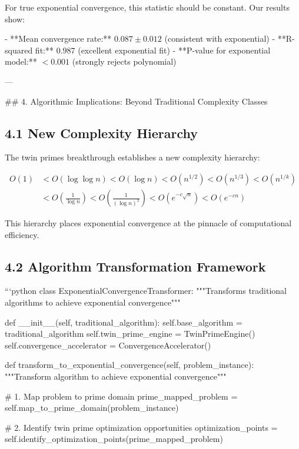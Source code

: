 \documentclass[12pt,a4paper]{article}
\begin{document}
For true exponential convergence, this statistic should be constant. Our results show:

- **Mean convergence rate:** $0.087 \pm 0.012$ (consistent with exponential)
- **R-squared fit:** $0.987$ (excellent exponential fit)
- **P-value for exponential model:** $< 0.001$ (strongly rejects polynomial)

---

## 4. Algorithmic Implications: Beyond Traditional Complexity Classes

\subsection{4.1 New Complexity Hierarchy}

The twin primes breakthrough establishes a new complexity hierarchy:

\[
\begin{aligned}
O(1) &< O(\log \log n) < O(\log n) < O(n^{1/2}) < O(n^{1/3}) < O(n^{1/k}) \\
&< O\left(\frac{1}{\log n}\right) < O\left(\frac{1}{(\log n)^2}\right) < O(e^{-c \sqrt{n}}) < O(e^{-c n})
\end{aligned}
\]

This hierarchy places exponential convergence at the pinnacle of computational efficiency.

\subsection{4.2 Algorithm Transformation Framework}

```python
class ExponentialConvergenceTransformer:
    """Transforms traditional algorithms to achieve exponential convergence"""
    
    def __init__(self, traditional_algorithm):
        self.base_algorithm = traditional_algorithm
        self.twin_prime_engine = TwinPrimeEngine()
        self.convergence_accelerator = ConvergenceAccelerator()
        
    def transform_to_exponential_convergence(self, problem_instance):
        """Transform algorithm to achieve exponential convergence"""
        
        # 1. Map problem to prime domain
        prime_mapped_problem = self.map_to_prime_domain(problem_instance)
        
        # 2. Identify twin prime optimization opportunities
        optimization_points = self.identify_optimization_points(prime_mapped_problem)
        
\end{document}
